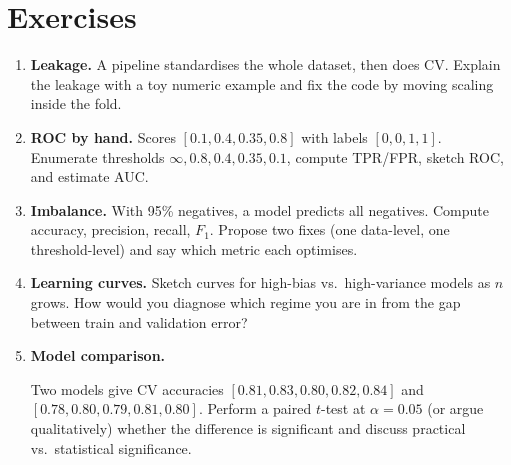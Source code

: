\section{Exercises}
\begin{enumerate}[label=E7.\arabic*, leftmargin=*, itemsep=0.6em]
    \item \textbf{Leakage.} A pipeline standardises the whole dataset, then does CV. Explain the leakage with a toy numeric example and fix the code by moving scaling inside the fold.
    \item \textbf{ROC by hand.} Scores $[0.1,0.4,0.35,0.8]$ with labels $[0,0,1,1]$. Enumerate thresholds $\infty,0.8,0.4,0.35,0.1$, compute TPR/FPR, sketch ROC, and estimate AUC.
    \item \textbf{Imbalance.} With 95\% negatives, a model predicts all negatives. Compute accuracy, precision, recall, $F_1$. Propose two fixes (one data-level, one threshold-level) and say which metric each optimises.
    \item \textbf{Learning curves.} Sketch curves for high-bias vs.\ high-variance models as $n$ grows. How would you diagnose which regime you are in from the gap between train and validation error?
    \item \textbf{Model comparison.} {\sloppy Two models give CV accuracies
    $[0.81,0.83,0.80,0.82,0.84]$ and $[0.78,0.80,0.79,0.81,0.80]$.
    Perform a paired $t$-test at $\alpha=0.05$ (or argue qualitatively)
    whether the difference is significant and discuss practical vs.\ statistical significance.\par}
\end{enumerate}
